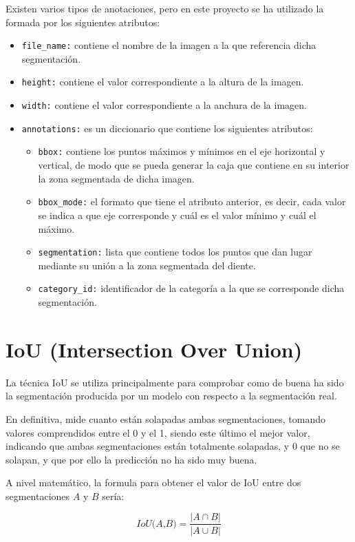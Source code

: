 Existen varios tipos de anotaciones, pero en este proyecto se ha utilizado la formada por los siguientes atributos:
\begin{itemize}
    \item \texttt{file\_name:} contiene el nombre de la imagen a la que referencia dicha segmentación.
    \item \texttt{height:} contiene el valor correspondiente a la altura de la imagen.
    \item \texttt{width:} contiene el valor correspondiente a la anchura de la imagen.
    \item \texttt{annotations:} es un diccionario que contiene los siguientes atributos:
    \begin{itemize}
        \item \texttt{bbox:} contiene los puntos máximos y mínimos en el eje horizontal y vertical, de modo que se pueda generar la caja que contiene en su interior la zona segmentada de dicha imagen.
        \item \texttt{bbox\_mode:} el formato que tiene el atributo anterior, es decir, cada valor se indica a que eje corresponde y cuál es el valor mínimo y cuál el máximo.
        \item \texttt{segmentation:} lista que contiene todos los puntos que dan lugar mediante su unión a la zona segmentada del diente.
        \item \texttt{category\_id:} identificador de la categoría a la que se corresponde dicha segmentación.
    \end{itemize}
\end{itemize}

\section{IoU (Intersection Over Union)}
La técnica IoU se utiliza principalmente para comprobar como de buena ha sido la segmentación producida por un modelo con respecto a la segmentación real. 

En definitiva, mide cuanto están solapadas ambas segmentaciones, tomando valores comprendidos entre el  0 y el 1, siendo este último el mejor valor, indicando que ambas segmentaciones están totalmente solapadas, y 0 que no se solapan, y que por ello la predicción no ha sido muy buena.

A nivel matemático, la formula para obtener el valor de IoU entre dos segmentaciones $A$ y $B$ sería:

$$\textit{IoU(A,B)} = \frac{\left | A \cap B \right |}{\left | A\cup B \right |}$$

